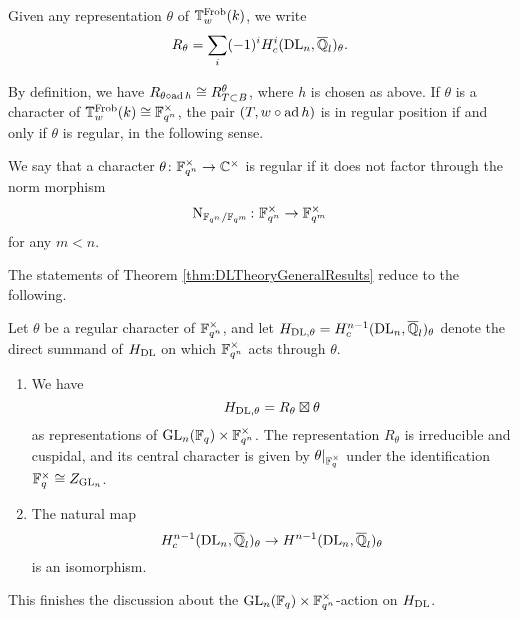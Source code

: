 \documentclass[../main.tex]{subfiles}
\begin{document}
Given any representation $\theta$ of $\mathbb{T}^{\mathrm{Frob}}_w(k)$, we write
\begin{equation*}
  R_\theta = \sum_i (-1)^i H_c^i(\mathrm{DL}_n, \overline {\mathbb{Q}}_l)_\theta.
\end{equation*}

By definition, we have $R_{\theta \circ \operatorname{ad} h} \cong R^\theta_{T\subset B}$,
where $h$ is chosen as above. If $\theta$ is a
character of $\mathbb{T}_w^{\mathrm{Frob}}(k) \cong \mathbb{F}_{q^n}^\times$, the pair $(T, w \circ \operatorname{ad}
h)$ is in regular position if and only if $\theta$ is regular, in the following
sense.

\begin{defi}
  We say that a character $\theta\colon  \mathbb{F}_{q^n}^\times \to \mathbb{C}^\times$ is 
  regular if it does not factor through the norm morphism
  $$\mathrm{N}_{\mathbb{F}_{q^n}/\mathbb{F}_{q^m}}\colon \mathbb{F}_{q^n}^\times \to \mathbb{F}_{q^m}^\times$$ 
  for any $m < n$.
\end{defi}


The statements of Theorem \ref{thm:DLTheoryGeneralResults} reduce to
the following.

\begin{thm}\label{thm:DLCorrespondenceForUs}
  Let $\theta$ be a regular character of $\mathbb{F}_{q^n}^\times$, and let
  $H_{\mathrm{DL},\theta} = H^{n-1}_c(\mathrm{DL}_n, \overline {\mathbb{Q}}_l)_\theta$ denote the direct
  summand of $H_\mathrm{DL}$ on which $\mathbb{F}_{q^n}^\times$
  acts through $\theta$. 
  \begin{enumerate}
    \item We have
      \begin{equation*}
        H_{\mathrm{DL},\theta} = R_\theta \boxtimes
        \theta
      \end{equation*}
      as representations of $\operatorname{GL}_n(\mathbb{F}_q) \times \mathbb{F}_{q^n}^\times$.
      The representation $R_\theta$ is irreducible and cuspidal, and its central
      character is given by $\theta|_{\mathbb{F}_q^\times}$ under the identification
      $\mathbb{F}_q^\times \cong Z_{\operatorname{GL}_n}$.
    \item The natural map 
      \begin{equation*}
        H^{n-1}_c(\mathrm{DL}_n, \overline {\mathbb{Q}}_l)_\theta \to
        H^{n-1}(\mathrm{DL}_n, \overline {\mathbb{Q}}_l)_\theta
      \end{equation*}
      is an isomorphism.
  \end{enumerate}
\end{thm}

This finishes the discussion about the $\operatorname{GL}_n(\mathbb{F}_q) \times \mathbb{F}_{q^n}^\times$-action
on $H_{\mathrm{DL}}$. 
\end{document}

